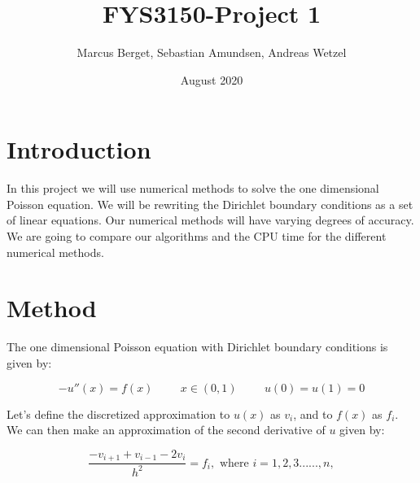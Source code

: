 \documentclass[norsk,a4paper,12pt]{article}
\begin{document}
\title{FYS3150-Project 1}
\author{Marcus Berget, Sebastian Amundsen, Andreas Wetzel}
\date{August 2020}
\maketitle

\begin{abstract}

\end{abstract}

\section{Introduction}

In this project we will use numerical methods to solve the one dimensional Poisson equation. We will be rewriting the Dirichlet boundary conditions as a set of linear equations. Our numerical methods will have varying degrees of accuracy. We are going to compare our algorithms and the CPU time for the different numerical methods. 

\section{Method}
The one dimensional Poisson equation with Dirichlet boundary conditions is given by:

\begin{equation}
-u''(x)=f(x) \hspace{1cm} x \in (0,1) \hspace{1cm} u(0)=u(1)=0
 \label{eq:udd}
 \end{equation}

Let's define the discretized approximation to $u(x)$ as $v_i$, and to $f(x)$ as $f_i$. We can then make an approximation of the second derivative of $u$ given by:

\begin{equation}
\frac{-v_{i+1}+v_{i-1}-2v_i}{h^2}=f_i, \textrm{  where  } i=1,2,3......,n,
 \label{eq:2der}
 \end{equation}
 
\end{document}
